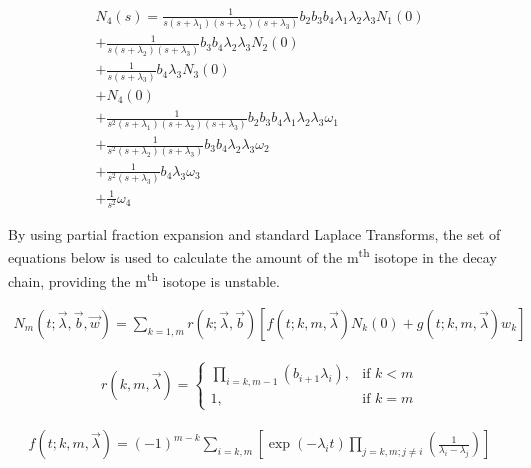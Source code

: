 \begin{equation}
\begin{split}
N_{4}(s) =
\frac{1}{s(s+\lambda_1)(s+\lambda_2)(s+\lambda_3)} b_{2} b_{3} b_{4} \lambda_1 \lambda_2 \lambda_3 N_{1}(0) \\
+ \frac{1}{s(s+\lambda_2)(s+\lambda_3)} b_{3} b_{4} \lambda_2 \lambda_3 N_{2}(0) \\
+ \frac{1}{s(s+\lambda_3)} b_{4} \lambda_3 N_{3}(0) \\
+ N_{4}(0) \\
+ \frac{1}{s^2(s+\lambda_1)(s+\lambda_2)(s+\lambda_3)} b_{2} b_{3} b_{4} \lambda_1 \lambda_2 \lambda_3 \omega_{1} \\
+ \frac{1}{s^2(s+\lambda_2)(s+\lambda_3)} b_{3} b_{4} \lambda_2 \lambda_3 \omega_{2} \\
+ \frac{1}{s^2(s+\lambda_3)} b_{4} \lambda_3 \omega_{3} \\
+ \frac{1}{s^2} \omega_{4}
\end{split}
\end{equation}

By using partial fraction expansion and standard Laplace Transforms, the set of equations below is used to calculate the amount of the m\textsuperscript{th} isotope in the decay chain, providing the m\textsuperscript{th} isotope is unstable.

\begin{equation}
\begin{split}
N_{m}(t; \vec{\lambda}, \vec{b}, \vec{w})
= \sum_{k=1,m} r(k; \vec{\lambda}, \vec{b}) \left[ f(t; k,m,\vec{\lambda}) N_{k}(0) + g(t;k,m,\vec{\lambda}) w_{k} \right ]
\end{split}
\end{equation}

\begin{equation}
\begin{split}
r(k,m,\vec{\lambda}) =
\begin{cases}
\prod_{i=k,m-1} \left( b_{i+1} \lambda_{i} \right) , & \text{if } k < m\\
1, & \text{if }k = m
\end{cases}
\end{split}
\end{equation}

\begin{equation}
\begin{split}
f(t;k,m,\vec{\lambda})
=
(-1)^{m-k}
\sum_{i=k,m}
\left[
\exp(-\lambda_i t)
\prod_{j=k,m;j\neq i}
\left(
\frac{1}{\lambda_i-\lambda_j}
\right )
\right ]
\end{split}
\end{equation}

